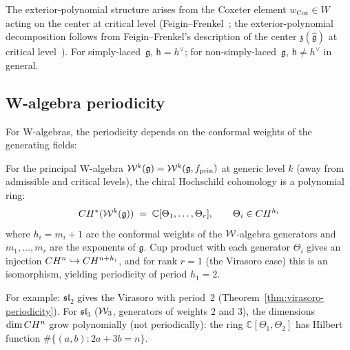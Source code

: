 The exterior-polynomial structure arises from the Coxeter element $w_{\mathrm{Cox}} \in W$ acting on the center at critical level (Feigin--Frenkel~\cite{Feigin-Frenkel}; the exterior-polynomial decomposition follows from Feigin--Frenkel's description of the center $\mathfrak{z}(\widehat{\mathfrak{g}})$ at critical level~\cite{Feigin-Frenkel}).  For simply-laced~$\mathfrak{g}$, $\mathsf{h} = h^\vee$; for non-simply-laced~$\mathfrak{g}$, $\mathsf{h} \neq h^\vee$ in general.

\subsection{W-algebra periodicity}

For W-algebras, the periodicity depends on the conformal weights of the generating fields:

\begin{theorem}\label{thm:w-algebra-hochschild}
For the principal W-algebra $\mathcal{W}^k(\mathfrak{g}) = \mathcal{W}^k(\mathfrak{g}, f_{\mathrm{prin}})$ at generic level $k$
(away from admissible and critical levels), the chiral Hochschild cohomology
is a polynomial ring:
\[CH^*(\mathcal{W}^k(\mathfrak{g}))
\;=\; \mathbb{C}[\Theta_1, \ldots, \Theta_r],
\qquad \Theta_i \in CH^{h_i}\]
where $h_i = m_i + 1$ are the conformal weights of the $\mathcal{W}$-algebra
generators and $m_1, \ldots, m_r$ are the exponents of $\mathfrak{g}$.
Cup product with each generator $\Theta_i$ gives an injection $CH^n \hookrightarrow CH^{n+h_i}$, and for rank $r = 1$ (the Virasoro case) this is an isomorphism, yielding periodicity of period $h_1 = 2$.

For example: $\mathfrak{sl}_2$ gives the Virasoro with period~$2$
(Theorem~\ref{thm:virasoro-periodicity}).  For $\mathfrak{sl}_3$ ($\mathcal{W}_3$,
generators of weights $2$ and $3$), the dimensions $\dim CH^n$
grow polynomially (not periodically): the ring $\mathbb{C}[\Theta_1, \Theta_2]$
has Hilbert function $\#\{(a,b) : 2a + 3b = n\}$.
\end{theorem}

